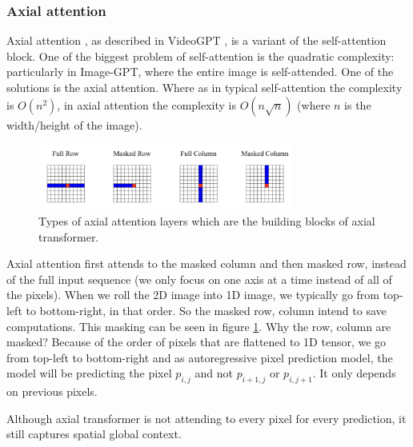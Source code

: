 \subsubsection{Axial attention}

Axial attention \cite{axial_attention}, as described in VideoGPT \cite{videogpt}, is a variant of the self-attention block. One of the biggest problem of self-attention is the quadratic complexity: particularly in Image-GPT, where the entire image is self-attended. One of the solutions is the axial attention. Where as in typical self-attention the complexity is $O(n^2)$, in axial attention the complexity is $O(n\sqrt{n})$ (where $n$ is the width/height of the image).

\begin{figure}
    \centering
    \includegraphics[width=0.75\textwidth]{images/appendix/attention/axial.png}
    \caption{Types of axial attention layers which are the building blocks of axial transformer.}
    \label{fig:axial_attention}
\end{figure}

Axial attention first attends to the masked column and then masked row, instead of the full input sequence (we only focus on one axis at a time instead of all of the pixels). When we roll the 2D image into 1D image, we typically go from top-left to bottom-right, in that order. So the masked row, column intend to save computations. This masking can be seen in figure \ref{fig:axial_attention}. Why the row, column are masked? Because of the order of pixels that are flattened to 1D tensor, we go from top-left to bottom-right and as autoregressive pixel prediction model, the model will be predicting the pixel $p_{i, j}$ and not $p_{i+1, j}$ or $p_{i, j+1}$. It only depends on previous pixels.

Although axial transformer is not attending to every pixel for every prediction, it still captures spatial global context.


